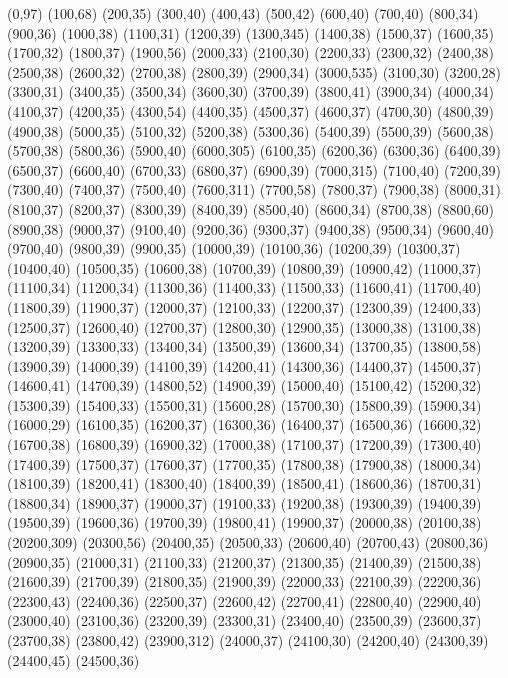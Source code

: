 (0,97)
(100,68)
(200,35)
(300,40)
(400,43)
(500,42)
(600,40)
(700,40)
(800,34)
(900,36)
(1000,38)
(1100,31)
(1200,39)
(1300,345)
(1400,38)
(1500,37)
(1600,35)
(1700,32)
(1800,37)
(1900,56)
(2000,33)
(2100,30)
(2200,33)
(2300,32)
(2400,38)
(2500,38)
(2600,32)
(2700,38)
(2800,39)
(2900,34)
(3000,535)
(3100,30)
(3200,28)
(3300,31)
(3400,35)
(3500,34)
(3600,30)
(3700,39)
(3800,41)
(3900,34)
(4000,34)
(4100,37)
(4200,35)
(4300,54)
(4400,35)
(4500,37)
(4600,37)
(4700,30)
(4800,39)
(4900,38)
(5000,35)
(5100,32)
(5200,38)
(5300,36)
(5400,39)
(5500,39)
(5600,38)
(5700,38)
(5800,36)
(5900,40)
(6000,305)
(6100,35)
(6200,36)
(6300,36)
(6400,39)
(6500,37)
(6600,40)
(6700,33)
(6800,37)
(6900,39)
(7000,315)
(7100,40)
(7200,39)
(7300,40)
(7400,37)
(7500,40)
(7600,311)
(7700,58)
(7800,37)
(7900,38)
(8000,31)
(8100,37)
(8200,37)
(8300,39)
(8400,39)
(8500,40)
(8600,34)
(8700,38)
(8800,60)
(8900,38)
(9000,37)
(9100,40)
(9200,36)
(9300,37)
(9400,38)
(9500,34)
(9600,40)
(9700,40)
(9800,39)
(9900,35)
(10000,39)
(10100,36)
(10200,39)
(10300,37)
(10400,40)
(10500,35)
(10600,38)
(10700,39)
(10800,39)
(10900,42)
(11000,37)
(11100,34)
(11200,34)
(11300,36)
(11400,33)
(11500,33)
(11600,41)
(11700,40)
(11800,39)
(11900,37)
(12000,37)
(12100,33)
(12200,37)
(12300,39)
(12400,33)
(12500,37)
(12600,40)
(12700,37)
(12800,30)
(12900,35)
(13000,38)
(13100,38)
(13200,39)
(13300,33)
(13400,34)
(13500,39)
(13600,34)
(13700,35)
(13800,58)
(13900,39)
(14000,39)
(14100,39)
(14200,41)
(14300,36)
(14400,37)
(14500,37)
(14600,41)
(14700,39)
(14800,52)
(14900,39)
(15000,40)
(15100,42)
(15200,32)
(15300,39)
(15400,33)
(15500,31)
(15600,28)
(15700,30)
(15800,39)
(15900,34)
(16000,29)
(16100,35)
(16200,37)
(16300,36)
(16400,37)
(16500,36)
(16600,32)
(16700,38)
(16800,39)
(16900,32)
(17000,38)
(17100,37)
(17200,39)
(17300,40)
(17400,39)
(17500,37)
(17600,37)
(17700,35)
(17800,38)
(17900,38)
(18000,34)
(18100,39)
(18200,41)
(18300,40)
(18400,39)
(18500,41)
(18600,36)
(18700,31)
(18800,34)
(18900,37)
(19000,37)
(19100,33)
(19200,38)
(19300,39)
(19400,39)
(19500,39)
(19600,36)
(19700,39)
(19800,41)
(19900,37)
(20000,38)
(20100,38)
(20200,309)
(20300,56)
(20400,35)
(20500,33)
(20600,40)
(20700,43)
(20800,36)
(20900,35)
(21000,31)
(21100,33)
(21200,37)
(21300,35)
(21400,39)
(21500,38)
(21600,39)
(21700,39)
(21800,35)
(21900,39)
(22000,33)
(22100,39)
(22200,36)
(22300,43)
(22400,36)
(22500,37)
(22600,42)
(22700,41)
(22800,40)
(22900,40)
(23000,40)
(23100,36)
(23200,39)
(23300,31)
(23400,40)
(23500,39)
(23600,37)
(23700,38)
(23800,42)
(23900,312)
(24000,37)
(24100,30)
(24200,40)
(24300,39)
(24400,45)
(24500,36)
